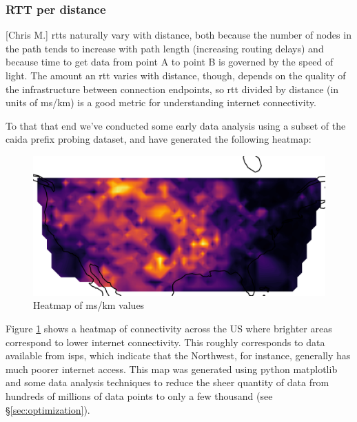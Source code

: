 \documentclass[12pt]{article}
\begin{document}
\subsubsection{RTT per distance}[Chris M.]
\acrshort{rtt}s naturally vary with distance, both because the number of nodes in the path tends to increase with path length (increasing routing delays) and because time to get data from point A to point B is governed by the speed of light. The amount an \acrshort{rtt} varies with distance, though, depends on the quality of the infrastructure between connection endpoints, so \acrshort{rtt} divided by distance (in units of ms/km) is a good metric for understanding internet connectivity.

To that that end we've conducted some early data analysis using a subset of the \acrshort{caida} prefix probing dataset, and have generated the following heatmap:

\begin{figure}[H]
    \centering
    \includegraphics[width=\textwidth]{images/CAIDA_connect_heatmap.png}
    \caption{Heatmap of ms/km values}
    \label{fig:caida_connectivity_heatmap}
\end{figure}

Figure \ref{fig:caida_connectivity_heatmap} shows a heatmap of connectivity across the US where brighter areas correspond to lower internet connectivity. This roughly corresponds to data available from \acrfull{isp}s, which indicate that the Northwest, for instance, generally has much poorer internet access. This map was generated using python matplotlib and some data analysis techniques to reduce the sheer quantity of data from hundreds of millions of data points to only a few thousand (see \S{}\ref{sec:optimization}).
\end{document}
